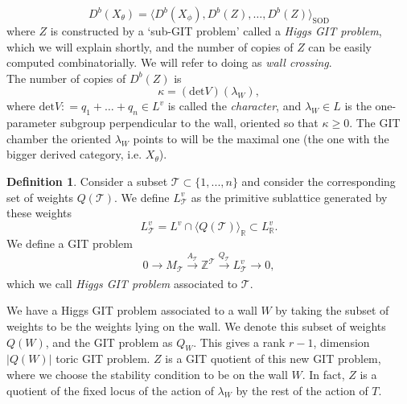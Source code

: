 \documentclass[oneside]{amsart}
\theoremstyle{definition}
\newtheorem{definition}{Definition}[section]
\theoremstyle{definition}
\theoremstyle{definition}
\theoremstyle{definition}
\newcommand{\defeq}{\mathrel{\mathop:}=}
\newcommand{\Z}{\mathbb{Z}}
\begin{document}
\begin{equation}
\label{wallcrossingformula}
D^b(X_{\theta}) = \langle D^b(X_{\phi}), D^b(Z),\dots, D^b(Z)\rangle_{\text{SOD}}
\end{equation}
where $Z$ is constructed by a `sub-GIT problem' called a \textit{Higgs GIT problem}, which we will explain shortly, and the number of copies of $Z$ can be easily computed combinatorially. We will refer to doing as \textit{wall crossing}. \\
\newline
The number of copies of $D^b(Z)$ is 
\begin{equation}
    \label{wcmult}
    \kappa = (\text{det} V) (\lambda_W),
\end{equation}
where $\text{det} V\defeq q_1 + \dots +q_n \in L^v$ is called the \textit{character}, and $\lambda_W \in L$ is the one-parameter subgroup perpendicular to the wall, oriented so that $\kappa \geq 0$. The GIT chamber the oriented $\lambda_W$ points to will be the maximal one (the one with the bigger derived category, i.e. $X_{\theta}$). 
\begin{definition}
Consider a subset $\mathcal{T} \subset \{1,...,n \}$ and consider the corresponding set of weights $Q(\mathcal{T})$. We define $L_{\mathcal{T}}^v$ as the primitive sublattice generated by these weights
$$L_{\mathcal{T}}^v= L^v \cap \langle  Q(\mathcal{T}) \rangle_{\mathbb{R}} \subset L_{\mathbb{R}}^v.
$$
We define a GIT problem
$$
0 \xrightarrow[]{} M_{\mathcal{T}} \xrightarrow[]{A_{\mathcal{T}}} \Z^\mathcal{T} \xrightarrow[]{Q_{\mathcal{T}}} L^v_{\mathcal{T}} \xrightarrow[]{} 0,
$$
which we call \textit{Higgs GIT problem} associated to $\mathcal{T}$.
\end{definition}
We have a Higgs GIT problem associated to a wall $W$ by taking the subset of weights to be the weights lying on the wall. We denote this subset of weights $Q(W)$, and the GIT problem as $Q_W$. This gives a rank $r-1$, dimension $|Q(W) |$ toric GIT problem. $Z$ is a GIT quotient of this new GIT problem, where we choose the stability condition to be on the wall $W$. In fact, $Z$ is a quotient of the fixed locus of the action of $\lambda_W$ by the rest of the action of $T$.
\end{document}
